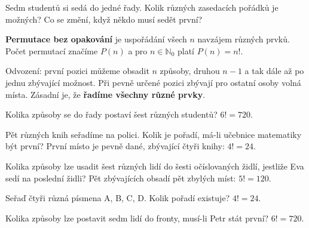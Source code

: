 \documentclass[11pt,a4paper]{article}
\begin{document}

Sedm studentů si sedá do jedné řady. Kolik různých zasedacích pořádků je možných? Co se změní, když někdo musí sedět první?



\begin{definiceBox}
\textbf{Permutace bez opakování} je uspořádání všech $n$ navzájem různých prvků. Počet permutací značíme $P(n)$ a pro $n\in\mathbb N_0$ platí $P(n)=n!$.
\end{definiceBox}
Odvození: první pozici můžeme obsadit $n$ způsoby, druhou $n-1$ a tak dále až po jednu zbývající možnost. Při pevně určené pozici zbývají pro ostatní osoby volná místa. Zásadní je, že \textbf{řadíme všechny různé prvky}.


\begin{prikladReseniBox}[title={Příklad 1}]
Kolika způsoby se do řady postaví šest různých studentů?
\tcblower
$6!=720$.
\end{prikladReseniBox}



\begin{prikladReseniBox}[title={Příklad 2}]
Pět různých knih seřadíme na polici. Kolik je pořadí, má-li učebnice matematiky být první?
\tcblower
První místo je pevně dané, zbývající čtyři knihy: $4!=24$.
\end{prikladReseniBox}



\begin{prikladReseniBox}[title={Příklad 3}]
Kolika způsoby lze usadit šest různých lidí do šesti očíslovaných židlí, jestliže Eva sedí na poslední židli?
\tcblower
Pět zbývajících obsadí pět zbylých míst: $5!=120$.
\end{prikladReseniBox}




\begin{zadaniReseniBox}[title={Samostatná práce 1}]
Seřaď čtyři různá písmena A, B, C, D. Kolik pořadí existuje?
\tcblower
$4!=24$.
\end{zadaniReseniBox}



\begin{zadaniReseniBox}[title={Samostatná práce 2}]
Kolika způsoby lze postavit sedm lidí do fronty, musí-li Petr stát první?
\tcblower
$6!=720$.
\end{zadaniReseniBox}
\end{document}
